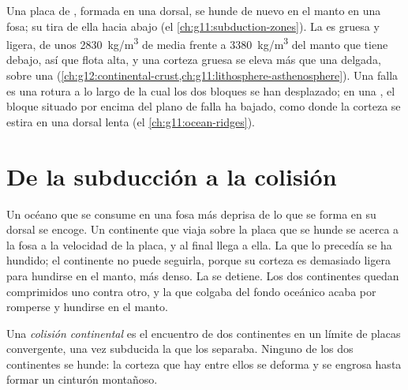 \begin{recall}
Una placa de , formada en una dorsal, se hunde de nuevo en
el manto en una fosa; su  tira de ella hacia abajo (el
\cref{ch:g11:subduction-zones}). La  es gruesa y ligera,
de unos \qty{2830}{kg/m^3} de media frente a \qty{3380}{kg/m^3} del manto que
tiene debajo, así que flota alta, y una corteza gruesa se eleva más que una
delgada, sobre una 
(\cref{ch:g12:continental-crust,ch:g11:lithosphere-asthenosphere}). Una falla
es una rotura a lo largo de la cual los dos bloques se han desplazado; en una
, el bloque situado por encima del plano de falla ha bajado, como
donde la corteza se estira en una dorsal lenta (el \cref{ch:g11:ocean-ridges}).
\end{recall}

\section{De la subducción a la colisión}

Un océano que se consume en una fosa más deprisa de lo que se forma en su
dorsal se encoge. Un continente que viaja sobre la placa que se hunde se
acerca a la fosa a la velocidad de la placa, y al final llega a ella. La
 que lo precedía se ha hundido; el continente no puede
seguirla, porque su corteza es demasiado ligera para hundirse en el manto,
más denso. La  se detiene. Los dos continentes quedan comprimidos
uno contra otro, y la  que colgaba del fondo oceánico acaba por romperse y
hundirse en el manto.

\begin{definition}\label{def:g12:mountain-building:collision}
Una \emph{colisión continental} es el
encuentro de dos continentes en un límite de placas convergente, una vez
subducida la  que los separaba. Ninguno de los dos
continentes se hunde: la corteza que hay entre ellos se deforma y se engrosa
hasta formar un cinturón montañoso.
\end{definition}

